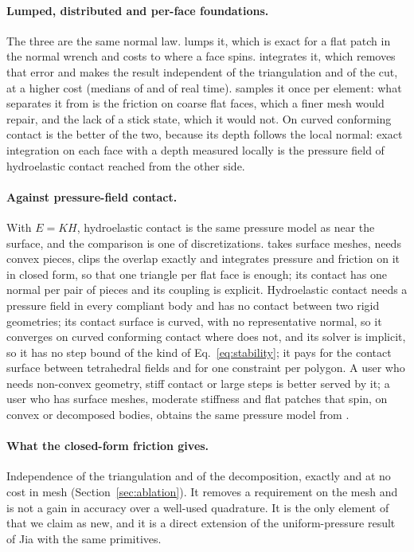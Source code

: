 \paragraph{Lumped, distributed and per-face foundations.} The three are the same normal law.
 lumps it, which is exact for a flat patch in the normal wrench and costs
 to  where a face spins.  integrates it, which removes
that error and makes the result independent of the triangulation and of the cut, at a higher cost (medians of
 and  of real time).  samples it once per element: what separates it from
 is the friction on coarse flat faces, which a finer mesh would repair, and
the lack of a stick state, which it would not. On curved conforming contact  is the
better of the two, because its depth follows the local normal: exact integration on each face
with a depth measured locally is the pressure field of hydroelastic contact reached from the
other side.

\paragraph{Against pressure-field contact.} With $E = K H$, hydroelastic contact is the same
pressure model as  near the surface, and the comparison is one of
discretizations.  takes surface meshes, needs convex pieces, clips the overlap
exactly and integrates pressure and friction on it in closed form, so that one triangle per
flat face is enough; its contact has one normal per pair of pieces and its coupling is
explicit. Hydroelastic contact needs a pressure field in every compliant body and has no
contact between two rigid geometries; its contact surface is curved, with no representative
normal, so it converges on curved conforming contact where  does not, and its
solver is implicit, so it has no step bound of the kind of Eq.~\eqref{eq:stability}; it pays
for the contact surface between tetrahedral fields and for one constraint per polygon. A user
who needs non-convex geometry, stiff contact or large steps is better served by it; a user who
has surface meshes, moderate stiffness and flat patches that spin, on convex or decomposed
bodies, obtains the same pressure model from .

\paragraph{What the closed-form friction gives.} Independence of the triangulation and of the
decomposition, exactly and at no cost in mesh (Section~\ref{sec:ablation}). It removes a
requirement on the mesh and is not a gain in accuracy over a well-used quadrature. It is the
only element of  that we claim as new, and it is a direct extension of the
uniform-pressure result of Jia \cite{Jia1997} with the same primitives.
